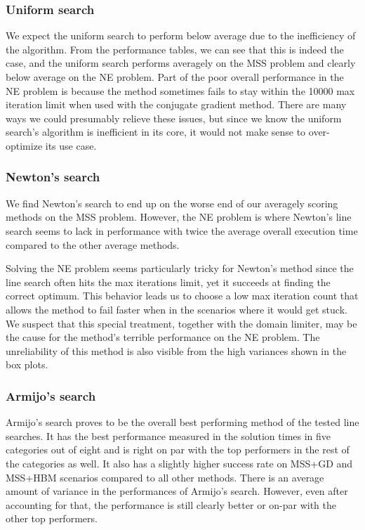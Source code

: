 \documentclass[english, 12pt, a4paper, sci, utf8, a-1b, online, table]{aaltothesis}
\begin{document}
\subsubsection*{Uniform search}

We expect the uniform search to perform below average due to the inefficiency of the algorithm. From the performance tables, we can see that this is indeed the case, and the uniform search performs averagely on the MSS problem and clearly below average on the NE problem. Part of the poor overall performance in the NE problem is because the method sometimes fails to stay within the 10000 max iteration limit when used with the conjugate gradient method. There are many ways we could presumably relieve these issues, but since we know the uniform search's algorithm is inefficient in its core, it would not make sense to over-optimize its use case.

\subsubsection*{Newton's search}

We find Newton's search to end up on the worse end of our averagely scoring methods on the MSS problem. However, the NE problem is where Newton's line search seems to lack in performance with twice the average overall execution time compared to the other average methods.

Solving the NE problem seems particularly tricky for Newton's method since the line search often hits the max iterations limit, yet it succeeds at finding the correct optimum. This behavior leads us to choose a low max iteration count that allows the method to fail faster when in the scenarios where it would get stuck. We suspect that this special treatment, together with the domain limiter, may be the cause for the method's terrible performance on the NE problem. The unreliability of this method is also visible from the high variances shown in the box plots.

\subsubsection*{Armijo's search}

Armijo's search proves to be the overall best performing method of the tested line searches. It has the best performance measured in the solution times in five categories out of eight and is right on par with the top performers in the rest of the categories as well. It also has a slightly higher success rate on MSS+GD and MSS+HBM scenarios compared to all other methods. There is an average amount of variance in the performances of Armijo's search. However, even after accounting for that, the performance is still clearly better or on-par with the other top performers.
\end{document}
